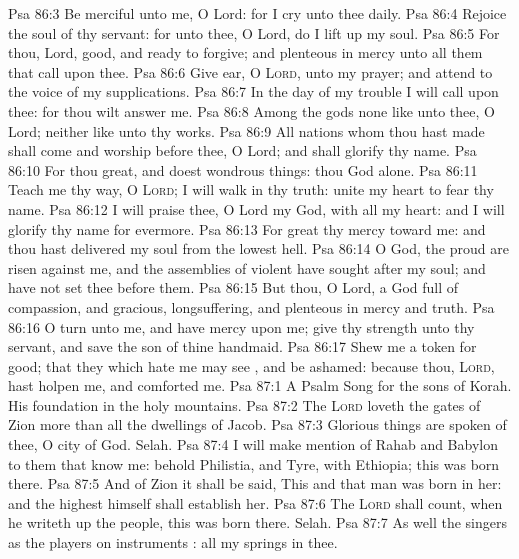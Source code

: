 \vs Psa 86:3 Be merciful unto me, O Lord: for I cry unto thee daily.
\vs Psa 86:4 Rejoice the soul of thy servant: for unto thee, O Lord, do I lift up my soul.
\vs Psa 86:5 For thou, Lord,  good, and ready to forgive; and plenteous in mercy unto all them that call upon thee.
\vs Psa 86:6 Give ear, O \textsc{Lord}, unto my prayer; and attend to the voice of my supplications.
\vs Psa 86:7 In the day of my trouble I will call upon thee: for thou wilt answer me.
\vs Psa 86:8 Among the gods  none like unto thee, O Lord; neither  like unto thy works.
\vs Psa 86:9 All nations whom thou hast made shall come and worship before thee, O Lord; and shall glorify thy name.
\vs Psa 86:10 For thou  great, and doest wondrous things: thou  God alone.
\vs Psa 86:11 Teach me thy way, O \textsc{Lord}; I will walk in thy truth: unite my heart to fear thy name.
\vs Psa 86:12 I will praise thee, O Lord my God, with all my heart: and I will glorify thy name for evermore.
\vs Psa 86:13 For great  thy mercy toward me: and thou hast delivered my soul from the lowest hell.
\vs Psa 86:14 O God, the proud are risen against me, and the assemblies of violent  have sought after my soul; and have not set thee before them.
\vs Psa 86:15 But thou, O Lord,  a God full of compassion, and gracious, longsuffering, and plenteous in mercy and truth.
\vs Psa 86:16 O turn unto me, and have mercy upon me; give thy strength unto thy servant, and save the son of thine handmaid.
\vs Psa 86:17 Shew me a token for good; that they which hate me may see , and be ashamed: because thou, \textsc{Lord}, hast holpen me, and comforted me.
\vs Psa 87:1 A Psalm  Song for the sons of Korah. His foundation  in the holy mountains.
\vs Psa 87:2 The \textsc{Lord} loveth the gates of Zion more than all the dwellings of Jacob.
\vs Psa 87:3 Glorious things are spoken of thee, O city of God. Selah.
\vs Psa 87:4 I will make mention of Rahab and Babylon to them that know me: behold Philistia, and Tyre, with Ethiopia; this  was born there.
\vs Psa 87:5 And of Zion it shall be said, This and that man was born in her: and the highest himself shall establish her.
\vs Psa 87:6 The \textsc{Lord} shall count, when he writeth up the people,  this  was born there. Selah.
\vs Psa 87:7 As well the singers as the players on instruments : all my springs  in thee.
